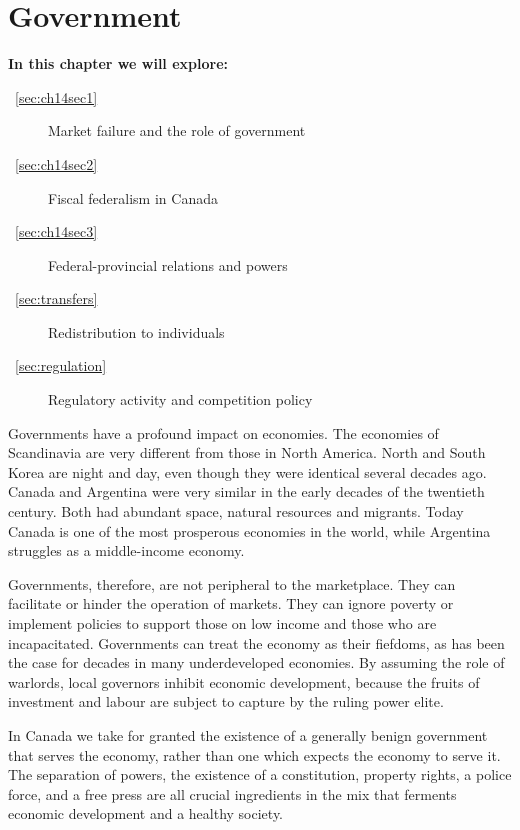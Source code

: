 \chapter{Government} \label{chap:government}

\begin{topics}
\textbf{In this chapter we will explore:}
\begin{description}
\item [~\ref{sec:ch14sec1}] Market failure and the role of government
\item [~\ref{sec:ch14sec2}] Fiscal federalism in Canada
\item [~\ref{sec:ch14sec3}] Federal-provincial relations and powers
\item [~\ref{sec:transfers}] Redistribution to individuals
\item [~\ref{sec:regulation}] Regulatory activity and competition policy
\end{description}
\end{topics}

Governments have a profound impact on economies. The economies of Scandinavia are very different from those in North America. North and South Korea are night and day, even though they were identical several decades ago. Canada and Argentina were very similar in the early decades of the twentieth century. Both had abundant space, natural resources and migrants. Today Canada is one of the most prosperous economies in the world, while Argentina struggles as a middle-income economy.

Governments, therefore, are not peripheral to the marketplace. They can facilitate or hinder the operation of markets. They can ignore poverty or implement policies to support those on low income and those who are incapacitated. Governments can treat the economy as their fiefdoms, as has been the case for decades in many underdeveloped economies. By assuming the role of warlords, local governors inhibit economic development, because the fruits of investment and labour are subject to capture by the ruling power elite. 

In Canada we take for granted the existence of a generally benign government that serves the economy, rather than one which expects the economy to serve it. The separation of powers, the existence of a constitution, property rights, a police force, and a free press are all crucial ingredients in the mix that ferments economic development and a healthy society.

